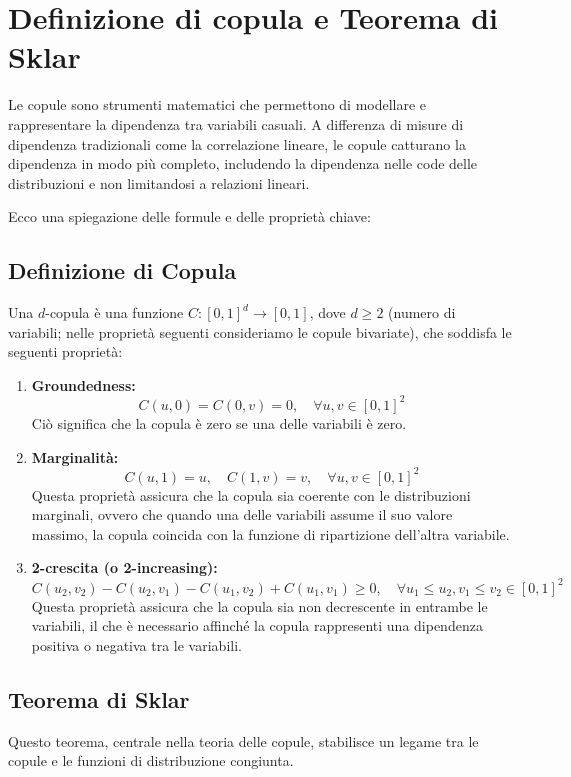 \documentclass[%
	corpo=11pt,
    twoside,
    stile=classica,
    oldstyle,
    tipotesi=custom,
    greek,
    evenboxes,
]{toptesi}
\begin{document}
\section{Definizione di copula e Teorema di Sklar}

Le copule sono strumenti matematici che permettono di modellare e rappresentare la dipendenza tra variabili casuali. A differenza di misure di dipendenza tradizionali come la correlazione lineare, le copule catturano la dipendenza in modo più completo, includendo la dipendenza nelle code delle distribuzioni e non limitandosi a relazioni lineari.

Ecco una spiegazione delle formule e delle proprietà chiave:

\subsection{Definizione di Copula}
Una \(d\)-copula è una funzione \( C : [0,1]^d \to [0,1] \), dove \( d \geq 2 \) (numero di variabili; nelle proprietà seguenti consideriamo le copule bivariate), che soddisfa le seguenti proprietà:

\begin{enumerate}
	\item \textbf{Groundedness:}  
	\[
	C(u,0) = C(0,v) = 0, \quad \forall u, v \in [0,1]^2
	\]
	Ciò significa che la copula è zero se una delle variabili è zero.
	
	\item \textbf{Marginalità:}  
	\[
	C(u,1) = u, \quad C(1,v) = v, \quad \forall u, v \in [0,1]^2
	\]
	Questa proprietà assicura che la copula sia coerente con le distribuzioni marginali, ovvero che quando una delle variabili assume il suo valore massimo, la copula coincida con la funzione di ripartizione dell’altra variabile.
	
	\item \textbf{2-crescita (o 2-increasing):}  
	\[
	C(u_2,v_2) - C(u_2,v_1) - C(u_1,v_2) + C(u_1,v_1) \geq 0, \quad \forall u_1 \leq u_2, v_1 \leq v_2 \in [0,1]^2
	\]
	Questa proprietà assicura che la copula sia non decrescente in entrambe le variabili, il che è necessario affinché la copula rappresenti una dipendenza positiva o negativa tra le variabili.
\end{enumerate}

\subsection{Teorema di Sklar}
Questo teorema, centrale nella teoria delle copule, stabilisce un legame tra le copule e le funzioni di distribuzione congiunta.  
\end{document}
